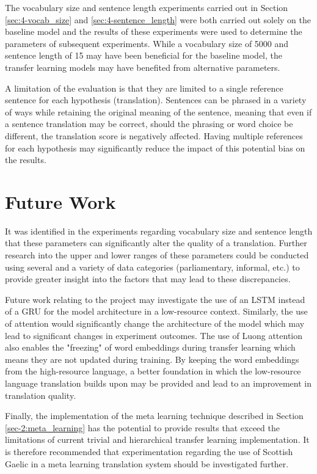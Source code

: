 The vocabulary size and sentence length experiments carried out in Section \ref{sec:4-vocab_size} and \ref{sec:4-sentence_length} were both carried out solely on the baseline model and the results of these experiments were used to determine the parameters of subsequent experiments. While a vocabulary size of 5000 and sentence length of 15 may have been beneficial for the baseline model, the transfer learning models may have benefited from alternative parameters.

A limitation of the evaluation is that they are limited to a single reference sentence for each hypothesis (translation). Sentences can be phrased in a variety of ways while retaining the original meaning of the sentence, meaning that even if a sentence translation may be correct, should the phrasing or word choice be different, the translation score is negatively affected. Having multiple references for each hypothesis may significantly reduce the impact of this potential bias on the results.



\section{Future Work}

It was identified in the experiments regarding vocabulary size and sentence length that these parameters can significantly alter the quality of a translation. Further research into the upper and lower ranges of these parameters could be conducted using several and a variety of data categories (parliamentary, informal, etc.) to provide greater insight into the factors that may lead to these discrepancies.

Future work relating to the project may investigate the use of an \acrshort{LSTM} instead of a \acrshort{GRU} for the model architecture in a low-resource context. Similarly, the use of \cite{luong_effective_2015} attention would significantly change the architecture of the model which may lead to significant changes in experiment outcomes. The use of Luong attention also enables the "freezing" of word embeddings during transfer learning which means they are not updated during training. By keeping the word embeddings from the high-resource language, a better foundation in which the low-resource language translation builds upon may be provided and lead to an improvement in translation quality.

Finally, the implementation of the meta learning technique described in Section \ref{sec-2:meta_learning} has the potential to provide results that exceed the limitations of current trivial and hierarchical transfer learning implementation. It is therefore recommended that experimentation regarding the use of Scottish Gaelic in a meta learning translation system should be investigated further.


